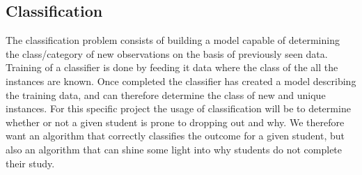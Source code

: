 \subsection{Classification}
The classification problem consists of building a model capable of determining
the class/category of new observations on the basis of previously seen data. 
Training of a classifier is done by feeding it data where the class of the all the instances are known.
Once completed the classifier has created a model describing the training data, 
and can therefore determine the class of new and unique instances.
For this specific project the usage of classification will be to determine whether or not a 
given student is prone to dropping out and why. 
We therefore want an algorithm that correctly classifies the outcome for a given student, 
but also an algorithm that can shine some light into why students do not complete their
study. 

%		


%


